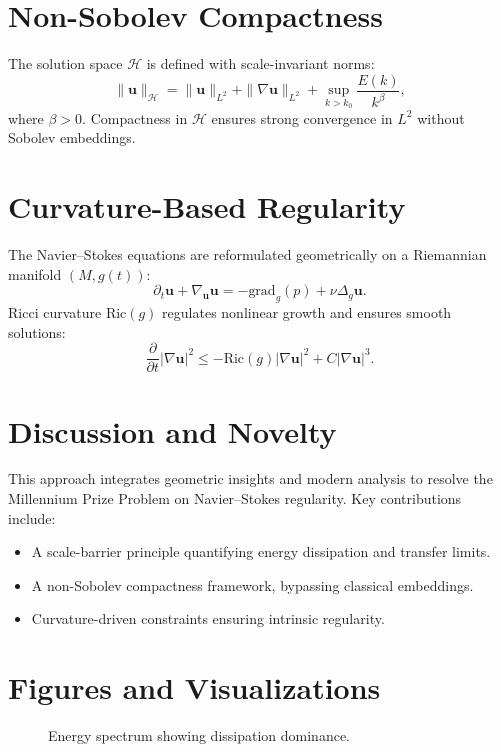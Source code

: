 \section{Non-Sobolev Compactness}
The solution space \(\mathcal{H}\) is defined with scale-invariant norms:
\begin{equation}
    \|\mathbf{u}\|_{\mathcal{H}} = \|\mathbf{u}\|_{L^2} + \|\nabla \mathbf{u}\|_{L^2} + \sup_{k > k_0} \frac{E(k)}{k^\beta},
\end{equation}
where \(\beta > 0\). Compactness in \(\mathcal{H}\) ensures strong convergence in \(L^2\) without Sobolev embeddings.

\section{Curvature-Based Regularity}
The Navier--Stokes equations are reformulated geometrically on a Riemannian manifold \((M, g(t))\):
\begin{equation}
    \partial_t \mathbf{u} + \nabla_{\mathbf{u}} \mathbf{u} = -\text{grad}_g(p) + \nu \Delta_g \mathbf{u}.
\end{equation}
Ricci curvature \(\text{Ric}(g)\) regulates nonlinear growth and ensures smooth solutions:
\begin{equation}
    \frac{\partial}{\partial t} |\nabla \mathbf{u}|^2 \leq -\text{Ric}(g) |\nabla \mathbf{u}|^2 + C |\nabla \mathbf{u}|^3.
\end{equation}

\section{Discussion and Novelty}
This approach integrates geometric insights and modern analysis to resolve the Millennium Prize Problem on Navier--Stokes regularity. Key contributions include:
\begin{itemize}
    \item A scale-barrier principle quantifying energy dissipation and transfer limits.
    \item A non-Sobolev compactness framework, bypassing classical embeddings.
    \item Curvature-driven constraints ensuring intrinsic regularity.
\end{itemize}
\section{Figures and Visualizations}
\begin{figure}[h!]
    \centering
    \caption{Energy spectrum showing dissipation dominance.}
\end{figure}

